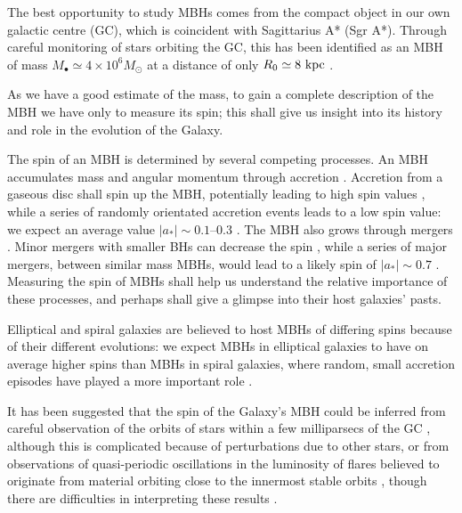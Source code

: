 The best opportunity to study MBHs comes from the compact object in our own galactic centre (GC), which is coincident with Sagittarius A* (Sgr A*). Through careful monitoring of stars orbiting the GC, this has been identified as an MBH of mass $M_\bullet \simeq 4 \times 10^6 M_\odot$ at a distance of only $R_0 \simeq 8~\mathrm{kpc}$ \citep{Gillessen2009, Meyer2012}.

As we have a good estimate of the mass, to gain a complete description of the MBH we have only to measure its spin; this shall give us insight into its history and role in the evolution of the Galaxy.

The spin of an MBH is determined by several competing processes. An MBH accumulates mass and angular momentum through accretion \citep{Volonteri2010}. Accretion from a gaseous disc shall spin up the MBH, potentially leading to high spin values \citep{Volonteri2005}, while a series of randomly orientated accretion events leads to a low spin value: we expect an average value $|a_\ast| \sim 0.1$--$0.3$ \citep{King2006, King2008}. The MBH also grows through mergers \citep{Yu2002, Malbon2007}. Minor mergers with smaller BHs can decrease the spin \citep{Hughes2003, Gammie2004}, while a series of major mergers, between similar mass MBHs, would lead to a likely spin of $|a_\ast| \sim 0.7$ \citep{Berti2008, Berti2007, Gonzalez2007}. Measuring the spin of MBHs shall help us understand the relative importance of these processes, and perhaps shall give a glimpse into their host galaxies' pasts.

Elliptical and spiral galaxies are believed to host MBHs of differing spins because of their different evolutions: we expect MBHs in elliptical galaxies to have on average higher spins than MBHs in spiral galaxies, where random, small accretion episodes have played a more important role \citep{Volonteri2007, Sikora2007}.

It has been suggested that the spin of the Galaxy's MBH could be inferred from careful observation of the orbits of stars within a few milliparsecs of the GC \citep{Merritt2010}, although this is complicated because of perturbations due to other stars, or from observations of quasi-periodic oscillations in the luminosity of flares believed to originate from material orbiting close to the innermost stable orbits \citep{Genzel2003a, Belanger2006, Trippe2007, Hamaus2009, Kato2010}, though there are difficulties in interpreting these results \citep{Psaltis2008a}.

